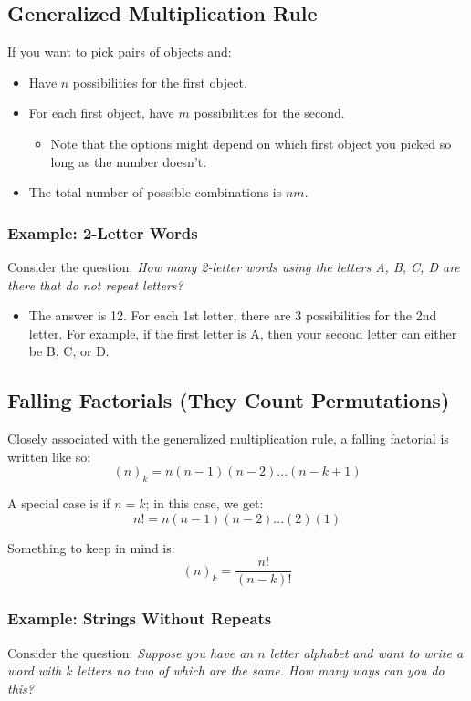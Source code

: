 \documentclass[letterpaper]{article}
\begin{document}
\subsection{Generalized Multiplication Rule}
If you want to pick pairs of objects and:
\begin{itemize}
    \item Have $n$ possibilities for the first object.
    \item For each first object, have $m$ possibilities for the second. 
    \begin{itemize}
        \item Note that the options might depend on which first object you picked so long as the number doesn't. 
    \end{itemize}

    \item The total number of possible combinations is $nm$.  
\end{itemize}

\subsubsection{Example: 2-Letter Words}
Consider the question: \emph{How many 2-letter words using the letters A, B, C, D are there that do not repeat letters?} 

\begin{itemize}
    \item The answer is 12. For each 1st letter, there are 3 possibilities for the 2nd letter. For example, if the first letter is A, then your second letter can either be B, C, or D.
\end{itemize}

\subsection{Falling Factorials (They Count Permutations)}
Closely associated with the generalized multiplication rule, a falling factorial is written like so:
\[(n)_k = n(n - 1)(n - 2)...(n - k + 1)\]

\bigskip

A special case is if $n = k$; in this case, we get:
\[n! = n(n - 1)(n - 2)...(2)(1)\]

\bigskip 

Something to keep in mind is:
\[(n)_k = \frac{n!}{(n - k)!}\]

\subsubsection{Example: Strings Without Repeats}
Consider the question: \emph{Suppose you have an $n$ letter alphabet and want to write a word with $k$ letters no two of which are the same. How many ways can you do this?} 
\end{document}
